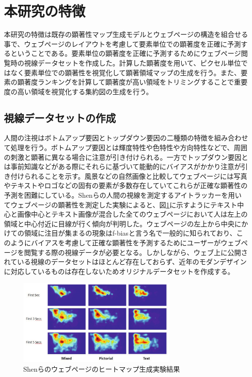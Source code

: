 \newpage
\renewcommand{\baselinestretch}{1.5}
\section{本研究の特徴}
\renewcommand{\baselinestretch}{1}
\par 本研究の特徴は既存の顕著性マップ生成モデルとウェブページの構造を組合せる事で、ウェブページのレイアウトを考慮して要素単位での顕著度を正確に予測するということである。要素単位の顕著度を正確に予測するためにウェブページ閲覧時の視線データセットを作成した。計算した顕著度を用いて、ピクセル単位ではなく要素単位での顕著性を視覚化して顕著領域マップの生成を行う。また、要素の顕著度ランキングを計算して顕著度が高い領域をトリミングすることで重要度の高い領域を視覚化する集約図の生成を行う。

\subsection{視線データセットの作成}
\par 人間の注視はボトムアップ要因とトップダウン要因の二種類の特徴を組み合わせて処理を行う。ボトムアップ要因とは輝度特性や色特性や方向特性などで、周囲の刺激と顕著に異なる場合に注意が引き付けられる。一方でトップダウン要因とは事前知識などがある際にそれらに基づいて能動的にバイアスがかかり注意が引き付けられることを示す。風景などの自然画像と比較してウェブページには写真やテキストやロゴなどの固有の要素が多数存在していてこれらが正確な顕著性の予測を困難にしている。Shenら\cite{shen2014webpage}の人間の視線を測定するアイトラッカーを用いてウェブページの顕著性を測定した実験によると、図\ref{fig_shen-experience}に示すようにテキスト中心と画像中心とテキスト画像が混合した全てのウェブページにおいて人は左上の領域と中心付近に目線が行く傾向が判明した。ウェブページの左上から中央にかけての領域に注目が集まるの現象はf-biasと言う名で一般的に知られており、このようにバイアスを考慮して正確な顕著性を予測するためにユーザーがウェブページを閲覧する際の視線データが必要となる。しかしながら、ウェブ上に公開されている視線のデータセットはほとんど存在しておらず、近年のモダンデザインに対応しているものは存在しないためオリジナルデータセットを作成する。

\begin{figure}[H]
  \centering
  \includegraphics[width=8cm]{figures/shen-bias.png}
  \caption{Shenらのウェブページのヒートマップ生成実験結果\cite{shen2014webpage}}
  \label{fig_shen-experience}
\end{figure}


